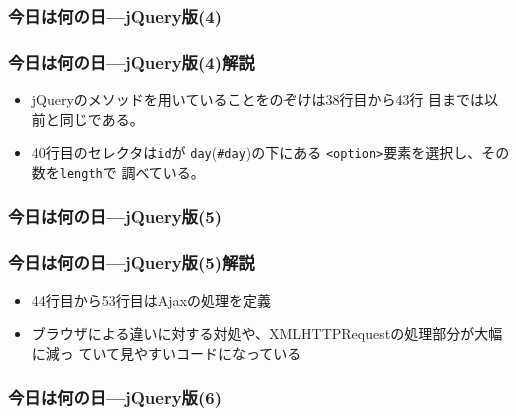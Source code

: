 \begin{frame}[containsverbatim]
 \frametitle{今日は何の日---jQuery版(4)}
 \end{frame}
\begin{frame}[containsverbatim]
 \frametitle{今日は何の日---jQuery版(4)解説}
 \begin{itemize}
  \item jQueryのメソッドを用いていることをのぞけは38行目から43行
	目までは以前と同じである。
  \item 40行目のセレクタは\texttt{id}が
	\texttt{day}(\texttt{\#day})の下にある
	\texttt{<option>}要素を選択し、その数を\texttt{length}で
	調べている。
\end{itemize}
 \end{frame}
\begin{frame}[containsverbatim]
\frametitle{今日は何の日---jQuery版(5)}
 \end{frame}
\begin{frame}[containsverbatim]
\frametitle{今日は何の日---jQuery版(5)解説}
\begin{itemize}
 \item  44行目から53行目はAjaxの処理を定義
 \item ブラウザによる違いに対する対処や、XMLHTTPRequestの処理部分が大幅に減っ
	       ていて見やすいコードになっている
\end{itemize}
 \end{frame}
\begin{frame}[containsverbatim]
\frametitle{今日は何の日---jQuery版(6)}
\end{frame}
\iffalse
